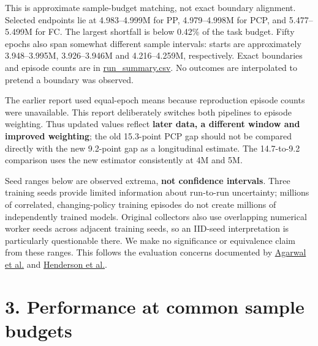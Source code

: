 \documentclass[
  10pt,
]{article}
\begin{document}
This is approximate sample-budget matching, not exact boundary
alignment. Selected endpoints lie at 4.983--4.999M for PP, 4.979--4.998M
for PCP, and 5.477--5.499M for FC. The largest shortfall is below 0.42\%
of the task budget. Fifty epochs also span somewhat different sample
intervals: starts are approximately 3.948--3.995M, 3.926--3.946M and
4.216--4.259M, respectively. Exact boundaries and episode counts are in
\href{full_runs/run_summary.csv}{run\_summary.csv}. No outcomes are
interpolated to pretend a boundary was observed.

The earlier report used equal-epoch means because reproduction episode
counts were unavailable. This report deliberately switches both
pipelines to episode weighting. Thus updated values reflect
\textbf{later data, a different window and improved weighting}; the old
15.3-point PCP gap should not be compared directly with the new
9.2-point gap as a longitudinal estimate. The 14.7-to-9.2 comparison
uses the new estimator consistently at 4M and 5M.

Seed ranges below are observed extrema, \textbf{not confidence
intervals}. Three training seeds provide limited information about
run-to-run uncertainty; millions of correlated, changing-policy training
episodes do not create millions of independently trained models.
Original collectors also use overlapping numerical worker seeds across
adjacent training seeds, so an IID-seed interpretation is particularly
questionable there. We make no significance or equivalence claim from
these ranges. This follows the evaluation concerns documented by
\href{https://arxiv.org/abs/2108.13264}{Agarwal et al.} and
\href{https://arxiv.org/abs/1709.06560}{Henderson et al.}.

\section{3. Performance at common sample
budgets}\label{performance-at-common-sample-budgets}
\end{document}
